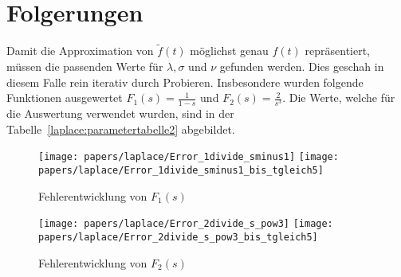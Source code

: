 %
%

\section{Folgerungen
\label{laplace:section:folgerungen}}
Damit die Approximation von $\tilde{f}(t)$ möglichst genau $f(t)$
repräsentiert,
müssen die passenden Werte für $\lambda, \sigma $ und $\nu $ gefunden werden. 
Dies geschah in diesem Falle rein iterativ durch Probieren.
Insbesondere wurden folgende Funktionen ausgewertet $
F_{1}(s)=\frac{1}{1-s} $ und $F_{2}(s) = \frac{2}{s^{3}}$.
Die Werte, welche für die Auswertung verwendet wurden, sind in der Tabelle~\ref{laplace:parametertabelle2} abgebildet.


\begin{figure}
\centering
\texttt{[image: papers/laplace/Error\_1divide\_sminus1]}
\texttt{[image: papers/laplace/Error\_1divide\_sminus1\_bis\_tgleich5]}
\caption{Fehlerentwicklung von $F_{1}(s)$
\label{laplace:fehlerf1}
}
\end{figure}


\begin{figure}
\centering
\texttt{[image: papers/laplace/Error\_2divide\_s\_pow3]}
\texttt{[image: papers/laplace/Error\_2divide\_s\_pow3\_bis\_tgleich5]}
\caption{Fehlerentwicklung von $F_{2}(s)$
\label{laplace:fehlerf2}
}
\end{figure}

